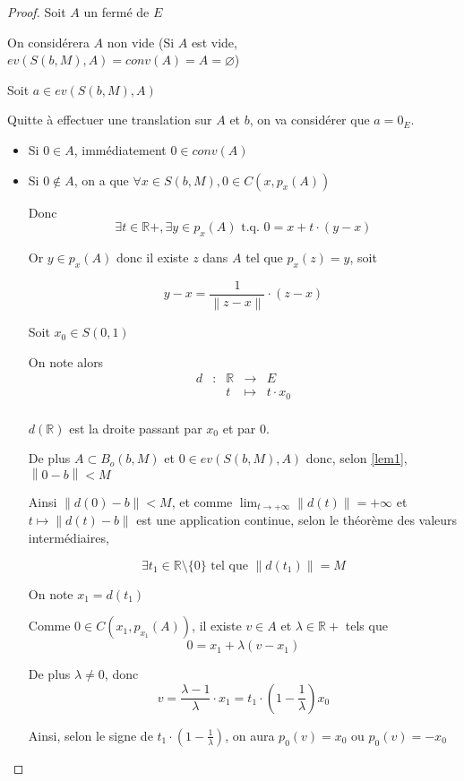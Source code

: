 \documentclass[a4paper]{article}
\newcommand{\norm}[1]{\left\lVert#1\right\rVert}
\begin{document}
\begin{proof}
Soit $A$ un fermé de $E$

On considérera $A$ non vide (Si $A$ est vide, $ev(S(b, M), A) = conv(A) = A = \varnothing$)

Soit $a \in ev(S(b, M), A)$

Quitte à effectuer une translation sur $A$ et $b$, on va considérer que $a = 0_{E}$.

\begin{itemize}
\item Si $0 \in A$, immédiatement $0 \in conv(A)$
\item Si $0 \notin A$, on a que $\forall x \in S(b, M), 0 \in C(x, p_{x}(A))$

Donc \[\exists t \in \mathbb{R}+, \exists y\in p_{x}(A) \text{ t.q. } 0 = x + t \cdot (y - x)\]

Or $y \in p_{x}(A)$ donc il existe $z$ dans $A$ tel que $p_{x}(z) = y$, soit

\[y - x = \frac{1}{\norm{z - x}} \cdot (z - x)\]


Soit $x_{0} \in S(0, 1)$

On note alors
\[\begin{array}{ccccl}
d& : & \mathbb{R} & \to & E \\
 & & t & \mapsto & t \cdot x_{0} \\
\end{array}\]

$d(\mathbb{R})$ est la droite passant par $x_{0}$  et par $0$.

De plus $A \subset B_{o}(b, M)$ et $0 \in ev(S(b, M), A)$ donc, selon \ref{lem1}, $\norm{0 - b} < M$

Ainsi $\norm{d(0) - b} < M$, et comme $\lim_{t \to +\infty}\norm{d(t)} = +\infty$ et $t \mapsto \norm{d(t) - b}$ est une application continue, selon le théorème des valeurs intermédiaires,

\[\exists t_{1} \in \mathbb{R}\setminus\{0\} \text{ tel que } \norm{d(t_{1})} = M\]

On note $x_{1} = d(t_{1})$

Comme $0 \in C(x_{1}, p_{x_{1}}(A))$, il existe $v \in A$ et $\lambda \in \mathbb{R}+$ tels que \[0 = x_{1} + \lambda (v - x_{1})\]

De plus $\lambda \neq 0$, donc \[v = \frac{\lambda - 1}{\lambda} \cdot x_{1} = t_{1} \cdot (1 - \frac{1}{\lambda}) x_{0}\]

Ainsi, selon le signe de $t_{1} \cdot (1 - \frac{1}{\lambda})$, on aura $p_{0}(v) = x_{0}$ ou $p_{0}(v) = - x_{0}$


\end{itemize}
\end{proof}
\end{document}
